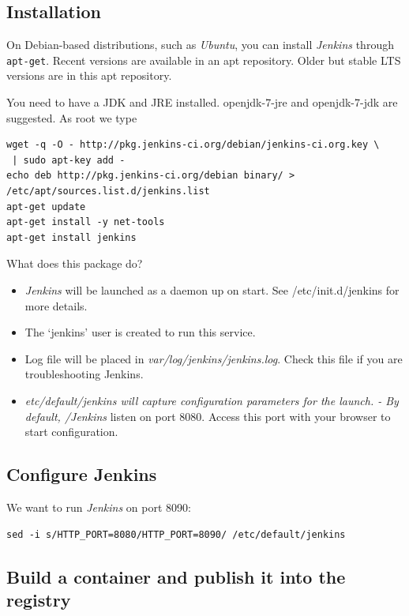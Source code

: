 \documentclass[11pt]{article}
\begin{document}
\subsection{Installation}
\label{sec-5-1}

On Debian-based distributions, such as \emph{Ubuntu}, you can install \emph{Jenkins} through \texttt{apt-get}. Recent versions are available in an apt repository. Older but stable LTS versions are in this apt repository.

You need to have a JDK and JRE installed. openjdk-7-jre and openjdk-7-jdk are suggested. As root we type

\begin{verbatim}
wget -q -O - http://pkg.jenkins-ci.org/debian/jenkins-ci.org.key \
 | sudo apt-key add - 
echo deb http://pkg.jenkins-ci.org/debian binary/ >  /etc/apt/sources.list.d/jenkins.list
apt-get update
apt-get install -y net-tools
apt-get install jenkins
\end{verbatim}

What does this package do?

\begin{itemize}
\item \emph{Jenkins} will be launched as a daemon up on start. See /etc/init.d/jenkins for more details.
\item The `jenkins' user is created to run this service.
\item Log file will be placed in \emph{var/log/jenkins/jenkins.log}. Check this file if you are troubleshooting Jenkins.
\item \emph{etc/default/jenkins will capture configuration parameters for the launch. - By default, /Jenkins} listen on port 8080. Access this port with your browser to start configuration.
\end{itemize}
\subsection{Configure Jenkins}
\label{sec-5-2}

We want to run \emph{Jenkins} on port 8090: 

\begin{verbatim}
sed -i s/HTTP_PORT=8080/HTTP_PORT=8090/ /etc/default/jenkins
\end{verbatim}
\subsection{Build a container and publish it into the registry}
\label{sec-5-3}
\end{document}
